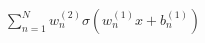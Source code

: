 \documentclass[preview]{standalone}
\begin{document}
\begin{align*}
\sum_{n=1}^{N} w_n^{(2)} \sigma(w_n^{(1)} x + b_n^{(1)})
\end{align*}
\end{document}
